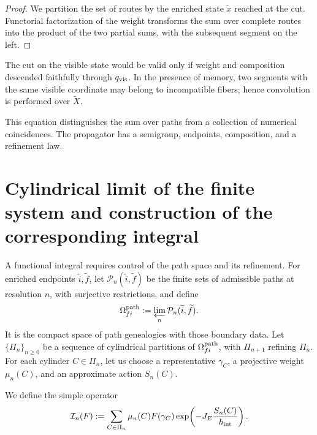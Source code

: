 \begin{proof}
We partition the set of routes by the enriched state
\(\widetilde x\) reached at the cut.
Functorial factorization of the weight transforms the sum over complete routes
into the product of the two partial sums, with the subsequent segment on the
left.
\end{proof}

The cut on the visible state would be valid only if weight and composition
descended faithfully through \(q_{\rm vis}\). In the presence of memory, two
segments with the same visible coordinate may belong to incompatible fibers; hence
convolution is performed over \(\widetilde X\).

This equation distinguishes the sum over paths from a collection of numerical
coincidences. The propagator has a semigroup, endpoints, composition, and a
refinement law.

\section{Cylindrical limit of the finite system and construction of the corresponding integral}

A functional integral requires control of the path space and its
refinement. For enriched endpoints \(\widetilde i,\widetilde f\), let
\(\mathcal P_n(\widetilde i,\widetilde f)\) be the finite sets of admissible paths
at resolution \(n\), with surjective restrictions, and define
\[
 \Omega_{fi}^{\rm path}
 :=\varprojlim_n\mathcal P_n(\widetilde i,\widetilde f).
\]
It is the compact space of path genealogies with those boundary data.
Let \(\{\Pi_n\}_{n\geq0}\) be a sequence of cylindrical partitions of
\(\Omega_{fi}^{\rm path}\), with \(\Pi_{n+1}\) refining \(\Pi_n\). For each
cylinder \(C\in\Pi_n\), let us choose a representative
\(\gamma_C\), a projective weight \(\mu_n(C)\), and an approximate action
\(S_n(C)\).

We define the simple operator
\begin{equation}
 \mathcal I_n(F)
 :=\sum_{C\in\Pi_n}
   \mu_n(C)
   F(\gamma_C)
   \exp\!\left(-J_E\frac{S_n(C)}{\hbar_{\rm int}}\right).
 \label{eq:integral-cilindrica-n}
\end{equation}

